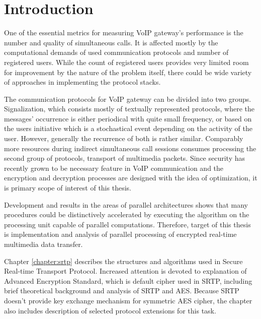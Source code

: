 
\chapter{Introduction} 
One of the essential metrics for measuring VoIP gateway's performance is the
number and quality of simultaneous calls. It is affected mostly by the
computational demands of used communication protocols and number of registered
users. While the count of registered users provides very limited room for 
improvement by the nature of the problem itself, there could be wide variety
of approaches in implementing the protocol stacks. 

The communication protocols for VoIP gateway can be divided into two groups. 
Signalization, which consists mostly of textually represented protocols, where 
the messages' occurrence is either periodical with quite small frequency, or 
based on the users initiative which is a stochastical event depending on the 
activity of the user. However, generally the recurrence of both is rather 
similar. Comparably more resources during indirect simultaneous call sessions 
consumes processing the second group of protocols, transport of multimedia 
packets. Since security has recently grown to be necessary feature in VoIP 
communication and the encryption and decryption processes are designed with the 
idea of optimization, it is primary scope of interest of this thesis.



Development and results in the areas of parallel architectures shows that many
procedures could be distinctively accelerated by executing the algorithm on the
processing unit capable of parallel computations. Therefore, target of this 
thesis is implementation and analysis of parallel processing of encrypted
real-time multimedia data transfer.



Chapter \ref{chapter:srtp} describes the structures and algorithms used in 
Secure Real-time Transport Protocol. Increased attention is devoted to 
explanation of Advanced Encryption Standard, which is default cipher used in 
SRTP, including brief theoretical background and analysis of SRTP and AES. 
Because SRTP doesn't provide key exchange mechanism for symmetric AES cipher, 
the chapter also includes description of selected protocol extensions for this
 task.

